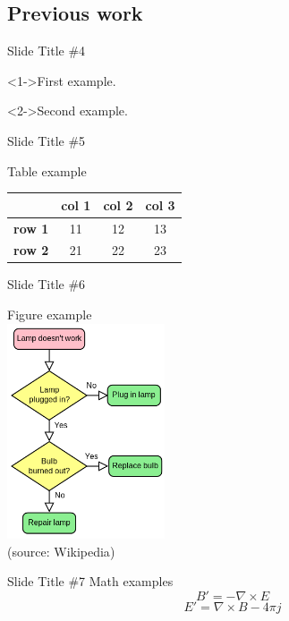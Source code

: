 \documentclass{beamer}
\begin{document}
\subsection{Previous work}

\begin{frame}{Slide Title \#4}
	\begin{example}
		<1->First example. 
	\end{example}
	\begin{example}
		<2->Second example.
	\end{example}
\end{frame}

\begin{frame}{Slide Title \#5}
	\begin{center}
		Table example \\[12pt]
		\begin{tabular}{c||c|c|c|}
			& \textbf{col 1} & \textbf{col  2} & \textbf{col 3} \\
			\hline
			\hline
			\textbf{row 1} & 11 & 12 & 13 \\
			\hline
			\textbf{row 2} & 21 & 22 & 23 \\
		\end{tabular}
    \end{center}
\end{frame}

\begin{frame}{Slide Title \#6}
	\begin{center}
		Figure example \\[12pt]
		\includegraphics[width=0.35\textwidth,keepaspectratio]{LampFlowchart.png}
		\\
		\footnotesize(source: \textlatin{Wikipedia})
    \end{center}
\end{frame}

\begin{frame}{Slide Title \#7}
	\centering
	Math examples \\[12pt]
	\begin{equation}
        	B'=-\nabla \times E
	\end{equation}
	\begin{equation*}
        	E'=\nabla \times B - 4\pi j
	\end{equation*}
\end{frame}
\end{document}

